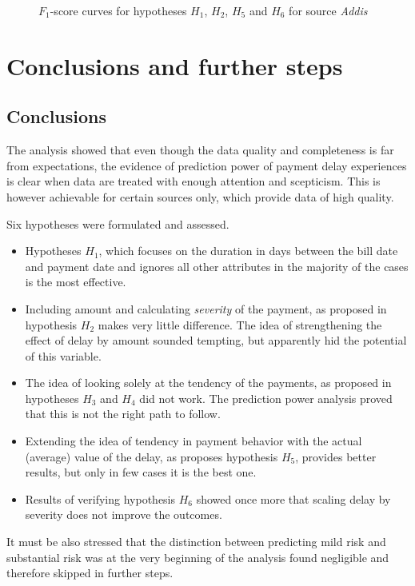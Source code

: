\documentclass{article}
\begin{document}
\begin{figure}[htbp!]
    \begin{center}
        
    \caption{$F_1$-score curves for hypotheses $H_1$, $H_2$, $H_5$ and $H_6$ for source \textit{Addis}}
    \label{fig:433_f1_curves_Addis}
    \end{center}
\end{figure}

\FloatBarrier

\pagebreak

\section{Conclusions and further steps}

\subsection{Conclusions}

The analysis showed that even though the data quality and completeness is far from expectations,
the evidence of prediction power of payment delay experiences is clear when data are treated with enough attention and scepticism.
This is however achievable for certain sources only, which provide data of high quality.
\par Six hypotheses were formulated and assessed.
\begin{itemize}
    \item Hypotheses $H_1$, which focuses on the duration in days between the bill date and payment date and ignores all other attributes in the majority of the cases is the most effective.
    \item Including amount and calculating \textit{severity} of the payment, as proposed in hypothesis $H_2$ makes very little difference. The idea of strengthening the effect of delay by amount sounded tempting, but apparently hid the potential of this variable.
    \item The idea of looking solely at the tendency of the payments, as proposed in hypotheses $H_3$ and $H_4$ did not work. The prediction power analysis proved that this is not the right path to follow.
    \item Extending the idea of tendency in payment behavior with the actual (average) value of the delay, as proposes hypothesis $H_5$, provides better results, but only in few cases it is the best one.
    \item Results of verifying hypothesis $H_6$ showed once more that scaling delay by severity does not improve the outcomes.
\end{itemize}
It must be also stressed that the distinction between predicting mild risk and substantial risk was at the very beginning of the analysis found negligible and therefore skipped in further steps.
\end{document}

